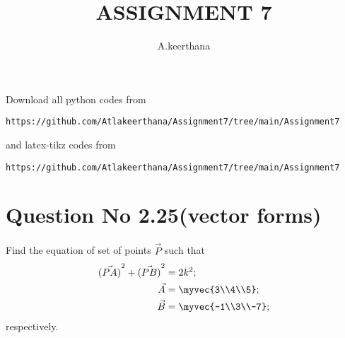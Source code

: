 \documentclass[journal,12pt,twocolumn]{IEEEtran}
\begin{document}
     \def\rightbox#1{\makebox[0in][r]{#1}}
     \def\centbox#1{\makebox[0in]{#1}}
     \def\topbox#1{\raisebox{-\baselineskip}[0in][0in]{#1}}
     \def\midbox#1{\raisebox{-0.5\baselineskip}[0in][0in]{#1}}
\vspace{3cm}
\title{ASSIGNMENT 7}
\author{A.keerthana}
\maketitle
\newpage
\bigskip
\renewcommand{\thefigure}{\theenumi}
\renewcommand{\thetable}{\theenumi}
Download all python codes from 
\begin{lstlisting}
https://github.com/Atlakeerthana/Assignment7/tree/main/Assignment7
\end{lstlisting}
%
and latex-tikz codes from 
%
\begin{lstlisting}
https://github.com/Atlakeerthana/Assignment7/tree/main/Assignment7
\end{lstlisting}
%
\section{Question No 2.25(vector forms)}
Find the equation of set of points $\vec P$ such that 
\begin{align}
 \vec{(PA)}^2+ \vec{(PB)}^2 &=2k^2;
 \\
  \vec A &=\myvec{3\\4\\5};
  \\
  \vec B &=\myvec{-1\\3\\-7};
\end{align}
respectively.
%
\end{document}
